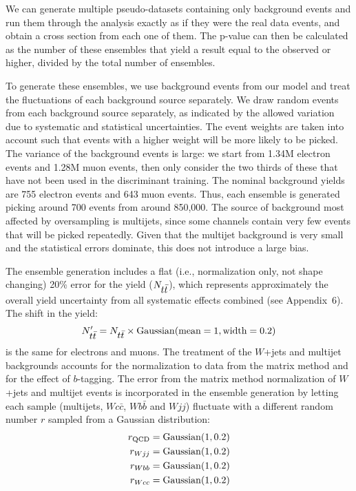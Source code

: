 We can generate multiple pseudo-datasets containing only background
events and run them through the analysis exactly as if they were the
real data events, and obtain a cross section from each one of
them. The p-value can then be calculated as the number of these
ensembles that yield a result equal to the observed or higher, divided
by the total number of ensembles.

To generate these ensembles, we use background events from our model
and treat the fluctuations of each background source separately. We
draw random events from each background source separately, as
indicated by the allowed variation due to systematic and statistical
uncertainties. The event weights are taken into account such that
events with a higher weight will be more likely to be picked. The
variance of the background events is large: we start from 1.34M
electron events and 1.28M muon events, then only consider the two
thirds of these that have not been used in the discriminant
training. The nominal background yields are 755 electron events and
643 muon events. Thus, each ensemble is generated picking around 700
events from around 850,000. The source of background most affected by
oversampling is multijets, since some channels contain very few events
that will be picked repeatedly. Given that the multijet background is
very small and the statistical errors dominate, this does not
introduce a large bias.

The ensemble generation includes a flat (i.e., normalization only, not
shape changing) 20\% error for the {\ttbar} yield ($N_{\mbox{$t\bar{t}$}}$),
which represents approximately the overall yield uncertainty from all
systematic effects combined (see Appendix~6). The shift in the
{\ttbar} yield:
$$
N_{\mbox{$t\bar{t}$}}^{\prime}
= N_{\mbox{$t\bar{t}$}}\times {\rm Gaussian}({\rm mean=1},{\rm width=0.2})
$$
is the same for electrons and muons. The treatment of the $W$+jets and
multijet backgrounds accounts for the normalization to data from the
matrix method and for the effect of $b$-tagging. The error from the
matrix method normalization of $W$+jets and multijet events is
incorporated in the ensemble generation by letting each sample
(multijets, $Wc\bar{c}$, $Wb\bar{b}$ and $Wjj$) fluctuate with a
different random number $r$ sampled from a Gaussian distribution:
\begin{eqnarray*}
r_{\rm QCD} = {\rm Gaussian}(1,0.2) \\
r_{Wjj}     = {\rm Gaussian}(1,0.2) \\
r_{Wbb}     = {\rm Gaussian}(1,0.2) \\
r_{Wcc}     = {\rm Gaussian}(1,0.2) 
\end{eqnarray*}

